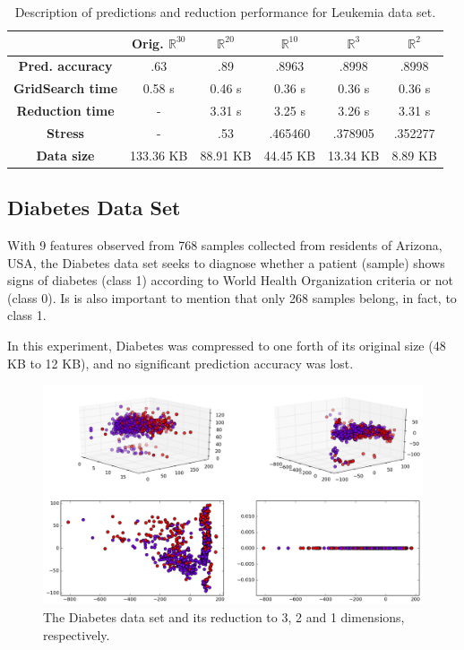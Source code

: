 \begin{table}[H]
	\centering
	\begin{tabular}{|c|c|c|c|c|c|}
		\hline
		& \textbf{Orig. $\mathbb{R}^{30}$} & \textbf{$\mathbb{R}^{20}$} & \textbf{$\mathbb{R}^{10}$} & \textbf{$\mathbb{R}^{3}$} & \textbf{$\mathbb{R}^{2}$} \\\hline
		\textbf{Pred. accuracy}    & .63 & .89 & .8963 & .8998  & .8998 \\\hline
		\textbf{GridSearch time}   & 0.58 s & 0.46 s & 0.36 s & 0.36 s & 0.36 s \\\hline
		\textbf{Reduction time}    & - & 3.31 s & 3.25 s & 3.26 s & 3.31 s \\\hline
		\textbf{Stress} & - & .53 & .465460 & .378905 & .352277 \\\hline
		\textbf{Data size}  & 133.36 KB & 88.91 KB & 44.45 KB & 13.34 KB & 8.89 KB \\\hline
	\end{tabular}
	\captionsetup{justification=centering}
	\caption{Description of predictions and reduction performance for Leukemia data set.}
\end{table}

\newpage
\subsection{Diabetes Data Set}

With 9 features observed from 768 samples collected from residents of Arizona, USA, the Diabetes data set seeks to diagnose whether a patient (sample) shows signs of diabetes (class 1) according to World Health Organization criteria or not (class 0). Is is also important to mention that only 268 samples belong, in fact, to class 1.

In this experiment, Diabetes was compressed to one forth of its original size (48 KB to 12 KB), and no significant prediction accuracy was lost.

\begin{figure}[H]
	\centering
	\includegraphics[width=.85\linewidth]{img/experiments/iso_diabetes}
	\captionsetup{justification=centering}
	\caption{The Diabetes data set and its reduction to 3, 2 and 1 dimensions, respectively.}
	\label{fig:iso_diabetes}
\end{figure}

